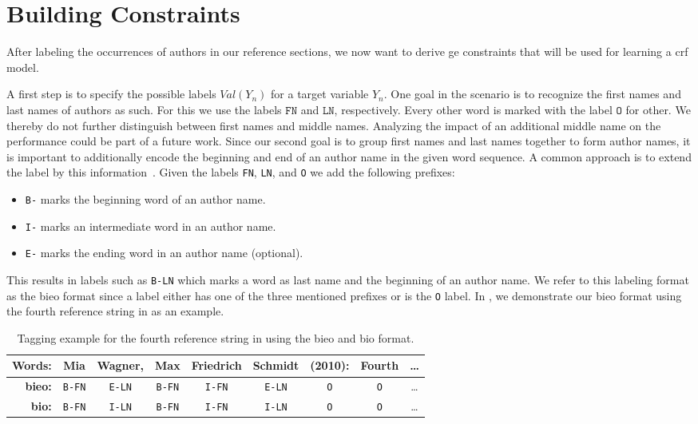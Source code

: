 \section{Building  Constraints}\label{sec:ae-building-ge-constraints}

After labeling the occurrences of authors in our reference sections, we now want to derive \gls{ge} constraints that will be used for learning a \gls{crf} model.

A first step is to specify the possible labels $\mathit{Val}(Y_n)$ for a \gls{target variable} $Y_n$.
One goal in the scenario is to recognize the first names and last names of authors as such.
For this we use the labels $\texttt{FN}$ and $\texttt{LN}$, respectively.
Every other word is marked with the label $\texttt{O}$ for other.
We thereby do not further distinguish between first names and middle names.
Analyzing the impact of an additional middle name on the performance could be part of a future work.
Since our second goal is to group first names and last names together to form author names, it is important to additionally encode the beginning and end of an author name in the given word sequence.
A common approach is to extend the label by this information~\citep[e.g.][]{ramshaw1995text,houngbo2012method}.
Given the labels \texttt{FN}, \texttt{LN}, and \texttt{O} we add the following prefixes:
\begin{itemize}
  \item \texttt{B-} marks the beginning word of an author name.
  \item \texttt{I-} marks an intermediate word in an author name.
  \item \texttt{E-} marks the ending word in an author name (optional).
\end{itemize}
This results in labels such as \texttt{B-LN} which marks a word as last name and the beginning of an author name.
We refer to this labeling format as the \gls{bieo} format since a label either has one of the three mentioned prefixes or is the \texttt{O} label.
In , we demonstrate our \gls{bieo} format using the fourth reference string in  as an example.
\begin{table}[t]
\centering
\begin{tabular}{r c c c c c c c c}
 \toprule
 \textbf{Words:} & Mia & Wagner, & Max & Friedrich & Schmidt & (2010): & Fourth & \dots\\
 \midrule
 \textbf{\acrshort{bieo}:} & \texttt{B-FN} & \texttt{E-LN} & \texttt{B-FN} & \texttt{I-FN} & \texttt{E-LN} & \texttt{O} & \texttt{O} & \dots\\
 \textbf{\acrshort{bio}:} & \texttt{B-FN} & \texttt{I-LN} & \texttt{B-FN} & \texttt{I-FN} & \texttt{I-LN} & \texttt{O} & \texttt{O} & \dots\\
 \bottomrule
\end{tabular}
\caption{Tagging example for the fourth reference string in  using the \acrshort{bieo} and \acrshort{bio} format.}
\label{tab:example-tagging}
\end{table}

